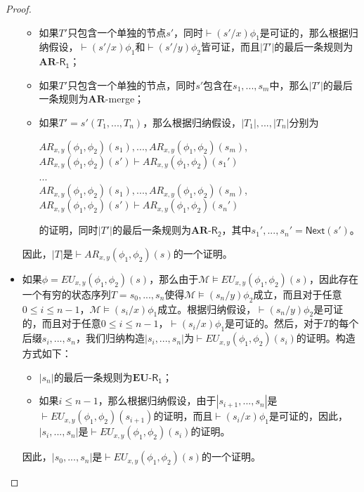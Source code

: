 \begin{proof}
\begin{itemize}
\begin{itemize}
			\item 如果$T'$只包含一个单独的节点$s'$，同时$\vdash (s'/x)\phi_1$是可证的，那么根据归纳假设，$\vdash (s'/x)\phi_1$和$\vdash (s'/y)\phi_2$皆可证，而且$|T'|$的最后一条规则为$\mathbf{AR}$-$\mathsf{R_1}$；

			\item 如果$T'$只包含一个单独的节点，同时$s'$包含在$s_1,...,s_m$中，那么$|T'|$的最后一条规则为$\mathbf{AR}$-merge；
			
			\item 如果$T' = s'(T_1, ..., T_n)$，那么根据归纳假设，$|T_1|,...,|T_n|$分别为
			\begin{center}
				$AR_{x,y}(\phi_1,\phi_2)(s_1),...,AR_{x,y}(\phi_1,\phi_2)(s_m)$, $AR_{x,y}(\phi_1,\phi_2)(s')\vdash AR_{x, y}(\phi_1,\phi_2)(s_1')$\\
				...\\
				$AR_{x,y}(\phi_1,\phi_2)(s_1),...,AR_{x,y}(\phi_1,\phi_2)(s_m)$, $AR_{x,y}(\phi_1,\phi_2)(s')\vdash AR_{x, y}(\phi_1,\phi_2)(s_n')$
			\end{center}
			的证明，同时$|T'|$的最后一条规则为$\mathbf{AR}$-$\mathsf{R_2}$，其中$s_1',...,s_n'=\mathsf{Next}(s')$。
			
		\end{itemize}
		
		因此，$|T|$是$\vdash AR_{x,y}(\phi_1,\phi_2)(s)$的一个证明。
		

		\item 如果$\phi = EU_{x,y}(\phi_1, \phi_2)(s)$，那么由于$\mathcal{M}\models EU_{x,y}(\phi_1, \phi_2)(s)$，因此存在一个有穷的状态序列$T = s_0, ..., s_n$使得$\mathcal{M}\models (s_n/y)\phi_2$成立，而且对于任意$0\le i\le n-1$，$\mathcal{M}\models (s_i/x)\phi_1$成立。根据归纳假设，$\vdash (s_n/y)\phi_2$是可证的，而且对于任意$0\le i\le n-1$，$\vdash (s_i/x)\phi_1$是可证的。然后，对于$T$的每个后缀$s_i,...,s_n$，我们归纳构造$|s_i, ..., s_n|$为$\vdash EU_{x,y}(\phi_1, \phi_2)(s_i)$的证明。构造方式如下：
		
		\begin{itemize}

			\item $|s_n|$的最后一条规则为$\mathbf{EU}$-$\mathsf{R_1}$；

			
			\item 如果$i\le n-1$，那么根据归纳假设，由于$|s_{i+1},...,s_n|$是$\vdash EU_{x,y}(\phi_1,\phi_2)(s_{i+1})$的证明，而且$\vdash (s_i/x)\phi_1$是可证的，因此，$|s_i,...,s_n|$是$\vdash EU_{x,y}(\phi_1, \phi_2)(s_i)$的证明。
		\end{itemize}

		
		因此，$|s_0,...,s_n|$是$\vdash EU_{x,y}(\phi_1,\phi_2)(s)$的一个证明。
	\end{itemize}
	
\end{proof}


